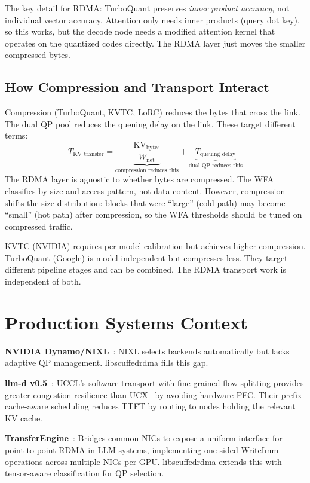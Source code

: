 \documentclass[11pt]{article}
\begin{document}
The key detail for RDMA: TurboQuant preserves \emph{inner product accuracy}, not individual vector accuracy. Attention only needs inner products (query dot key), so this works, but the decode node needs a modified attention kernel that operates on the quantized codes directly. The RDMA layer just moves the smaller compressed bytes.

\subsection{How Compression and Transport Interact}

Compression (TurboQuant, KVTC, LoRC) reduces the bytes that cross the link. The dual QP pool reduces the queuing delay on the link. These target different terms:
\[
T_{\text{KV transfer}} = \underbrace{\frac{\text{KV}_{\text{bytes}}}{W_{\text{net}}}}_{\text{compression reduces this}} + \underbrace{T_{\text{queuing delay}}}_{\text{dual QP reduces this}}
\]
The RDMA layer is agnostic to whether bytes are compressed. The WFA classifies by size and access pattern, not data content. However, compression shifts the size distribution: blocks that were ``large'' (cold path) may become ``small'' (hot path) after compression, so the WFA thresholds should be tuned on compressed traffic.

KVTC (NVIDIA) requires per-model calibration but achieves higher compression. TurboQuant (Google) is model-independent but compresses less. They target different pipeline stages and can be combined. The RDMA transport work is independent of both.

\section{Production Systems Context}

\textbf{NVIDIA Dynamo/NIXL}~\cite{nvidia_dynamo2025}: NIXL selects backends automatically but lacks adaptive QP management. libscuffedrdma fills this gap.

\textbf{llm-d v0.5}~\cite{llmd_v05}: UCCL's software transport with fine-grained flow splitting provides greater congestion resilience than UCX~\cite{nvidia_ucx} by avoiding hardware PFC. Their prefix-cache-aware scheduling reduces TTFT by routing to nodes holding the relevant KV cache.

\textbf{TransferEngine}~\cite{chen2025transferengine}: Bridges common NICs to expose a uniform interface for point-to-point RDMA in LLM systems, implementing one-sided WriteImm operations across multiple NICs per GPU. libscuffedrdma extends this with tensor-aware classification for QP selection.
\end{document}
